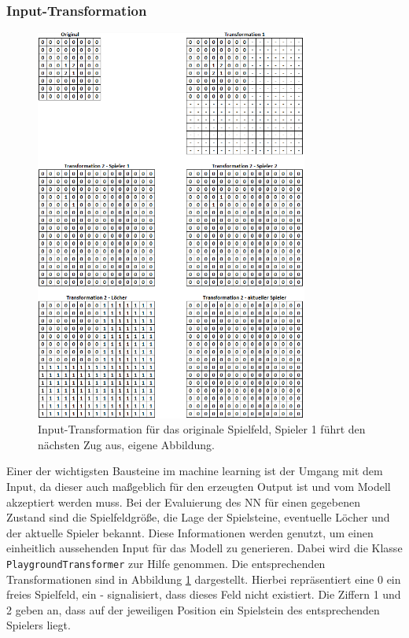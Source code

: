 \documentclass[12pt,a4paper]{article}
\begin{document}
\subsubsection{Input-Transformation}
\begin{figure}
	\centering
	\includegraphics[width=0.8\textwidth]{pics/input_transform.png}	
	\caption{Input-Transformation für das originale Spielfeld, Spieler 1 führt den nächsten Zug aus, eigene Abbildung.}
	\label{fig:input_transformation}
\end{figure}
Einer der wichtigsten Bausteine im machine learning ist der Umgang mit dem Input, da dieser auch maßgeblich für den erzeugten Output ist und vom Modell akzeptiert werden muss. Bei der Evaluierung des NN für einen gegebenen Zustand sind die Spielfeldgröße, die Lage der Spielsteine, eventuelle Löcher und der aktuelle Spieler bekannt. Diese Informationen werden genutzt, um einen einheitlich aussehenden Input für das Modell zu generieren. Dabei wird die Klasse \texttt{PlaygroundTransformer} zur Hilfe genommen. Die entsprechenden Transformationen sind in Abbildung \ref{fig:input_transformation} dargestellt. Hierbei repräsentiert eine \glqq{}0\grqq{} ein freies Spielfeld, ein \glqq{}-\grqq{} signalisiert, dass dieses Feld nicht existiert. Die Ziffern \glqq{}1\grqq{} und \glqq{}2\grqq{} geben an, dass auf der jeweiligen Position ein Spielstein des entsprechenden Spielers liegt.
\end{document}
